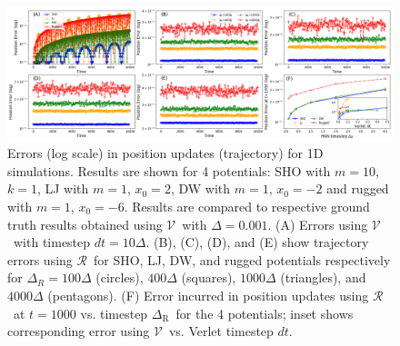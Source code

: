 \documentclass[aps,prl,twocolumn,superscriptaddress,tightenlines,longbibliography, reprint]{revtex4-1}
\newcommand{\dtR}{$\Delta_{\textrm{R}}$}
\newcommand{\R}{$\mathscr{R}$}
\newcommand{\V}{$\mathscr{V}$}
\begin{document}
\begin{figure}[htb]
\centering
\includegraphics[width=1.0\textwidth]{figures/fig3.png}
\caption{Errors (log scale) in position updates (trajectory) for 1D simulations. Results are shown for 4 potentials: SHO with $m=10$, $k=1$, LJ with $m=1$, $x_0=2$, DW with $m=1$, $x_0=-2$ and rugged with $m=1$, $x_0=-6$. Results are compared to respective ground truth results obtained using \V\ with $\Delta = 0.001$. (A) Errors using \V\ with  timestep $dt = 10\Delta$. (B), (C), (D), and (E) show trajectory errors using \R\ for SHO, LJ, DW, and rugged potentials respectively for $\Delta_R = 100\Delta$ (circles), $400\Delta$ (squares), $1000\Delta$ (triangles), and $4000\Delta$ (pentagons).  (F) Error incurred in position updates using \R\ at $t=1000$ vs. timestep \dtR\ for the 4 potentials; inset shows corresponding error using \V\ vs. Verlet timestep $dt$.}
\label{fig:manypotentials}
\end{figure}
\end{document}
